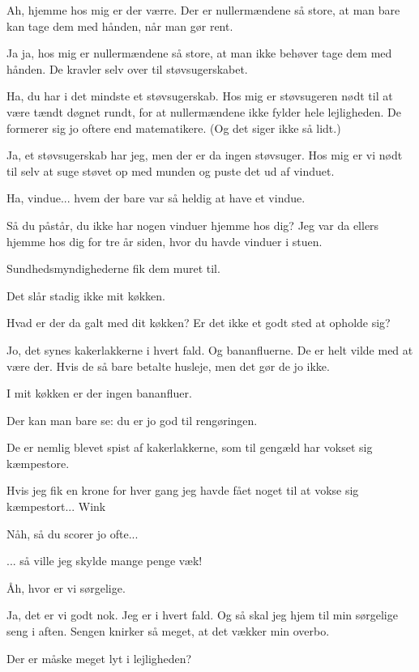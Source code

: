 \documentclass[a4paper,11pt]{article}
\begin{document}
\begin{sketch}
 Ah, hjemme hos mig er der værre. Der er nullermændene så store, at man bare kan tage dem med hånden, når man gør rent.

 Ja ja, hos mig er nullermændene så store, at man ikke behøver tage dem med hånden. De kravler selv over til støvsugerskabet.

 Ha, du har i det mindste et støvsugerskab. Hos mig er støvsugeren nødt til at være tændt døgnet rundt, for at nullermændene ikke fylder hele lejligheden. De formerer sig jo oftere end matematikere. (Og det siger ikke så lidt.)

 Ja, et støvsugerskab har jeg, men der er da ingen støvsuger. Hos mig er vi nødt til selv at suge støvet op med munden og puste det ud af vinduet.

 Ha, vindue... hvem der bare var så heldig at have et vindue.

 Så du påstår, du ikke har nogen vinduer hjemme hos dig? Jeg var da ellers hjemme hos dig for tre år siden, hvor du havde vinduer i stuen.

 Sundhedsmyndighederne fik dem muret til.

 Det slår stadig ikke mit køkken.

 Hvad er der da galt med dit køkken? Er det ikke et godt sted at opholde sig?

 Jo, det synes kakerlakkerne i hvert fald. Og bananfluerne. De er helt vilde med at være der. Hvis de så bare betalte husleje, men det gør de jo ikke.

 I mit køkken er der ingen bananfluer.

 Der kan man bare se: du er jo god til rengøringen.

 De er nemlig blevet spist af kakerlakkerne, som til gengæld har vokset sig kæmpestore.

 Hvis jeg fik en krone for hver gang jeg havde fået noget til at vokse sig kæmpestort... Wink

 Nåh, så du scorer jo ofte...

 ... så ville jeg skylde mange penge væk!

 Åh, hvor er vi sørgelige.

 Ja, det er vi godt nok. Jeg er i hvert fald. Og så skal jeg hjem til min sørgelige seng i aften. Sengen knirker så meget, at det vækker min overbo.

 Der er måske meget lyt i lejligheden?


\end{sketch}
\end{document}
